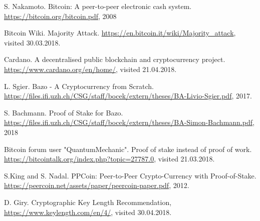 \documentclass[12pt,a4]{article}
\begin{document}
\begin{thebibliography}{5}
	S. Nakamoto. Bitcoin: A peer-to-peer electronic cash system.
	\url{https://bitcoin.org/bitcoin.pdf}, 2008
	
	Bitcoin Wiki. Majority Attack.
	\url{https://en.bitcoin.it/wiki/Majority_attack}, visited 30.03.2018.
	
	Cardano. A decentralised public blockchain and cryptocurrency project.
	\url{https://www.cardano.org/en/home/}, visited 21.04.2018.
	
	L. Sgier. Bazo - A Cryptocurrency from Scratch. \url{https://files.ifi.uzh.ch/CSG/staff/bocek/extern/theses/BA-Livio-Sgier.pdf}, 2017.
	
	S. Bachmann. Proof of Stake for Bazo. \url{https://files.ifi.uzh.ch/CSG/staff/bocek/extern/theses/BA-Simon-Bachmann.pdf}, 2018

	Bitcoin forum user "QuantumMechanic". Proof of stake instead of proof of work. \url{https://bitcointalk.org/index.php?topic=27787.0}, visited 21.03.2018.
	
	S.King and S. Nadal. PPCoin: Peer-to-Peer Crypto-Currency with Proof-of-Stake. \url{https://peercoin.net/assets/paper/peercoin-paper.pdf}, 2012.
	
	D. Giry. Cryptographic Key Length Recommendation, \url{https://www.keylength.com/en/4/}, visited 30.04.2018.
\end{thebibliography}
\end{document}
